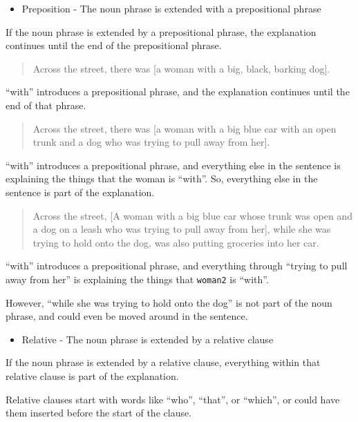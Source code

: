 \documentclass[
]{book}
\providecommand{\tightlist}{%
  \setlength{\itemsep}{0pt}\setlength{\parskip}{0pt}}
\begin{document}
\begin{itemize}
\tightlist
\item
  Preposition - The noun phrase is extended with a prepositional phrase
\end{itemize}

If the noun phrase is extended by a prepositional phrase,
the explanation continues until the end of the prepositional phrase.

\begin{quote}
Across the street,
there was {[}a woman with a big, black, barking dog{]}.
\end{quote}

``with'' introduces a prepositional phrase,
and the explanation continues until the end of that phrase.

\begin{quote}
Across the street,
there was {[}a woman with a big blue car with an open trunk
and a dog who was trying to pull away from her{]}.
\end{quote}

``with'' introduces a prepositional phrase,
and everything else in the sentence
is explaining the things that the woman is ``with''.
So, everything else in the sentence is part of the explanation.

\begin{quote}
Across the street,
{[}A woman with a big blue car whose trunk was open
and a dog on a leash who was trying to pull away from her{]},
while she was trying to hold onto the dog,
was also putting groceries into her car.
\end{quote}

``with'' introduces a prepositional phrase,
and everything through ``trying to pull away from her''
is explaining the things that \texttt{woman2} is ``with''.

However, ``while she was trying to hold onto the dog''
is not part of the noun phrase,
and could even be moved around in the sentence.

\begin{itemize}
\tightlist
\item
  Relative - The noun phrase is extended by a relative clause
\end{itemize}

If the noun phrase is extended by a relative clause,
everything within that relative clause is part of the explanation.

Relative clauses start with words like ``who'', ``that'', or ``which'',
or could have them inserted before the start of the clause.
\end{document}

